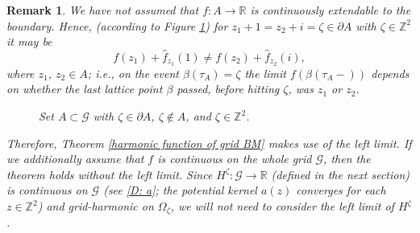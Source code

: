 \documentclass[11pt]{article}
\numberwithin{equation}{section}
\def\OZ{\Omega_{\zeta}}
\newtheorem*{remark}{Remark}
\begin{document}
\begin{remark}
  We have not assumed that $f: A \rightarrow \mathbb{R}$ is 
  continuously extendable to the boundary. 
  Hence, (according to Figure \ref{fig: set A}) for 
  $z_1 +1 = z_2 + i = \zeta \in \partial A$ 
  with $\zeta \in \mathbb{Z}^2$ it may be
  \begin{equation}\nonumber
    f(z_1) + \hat{f}_{z_1}(1) 
    \neq f(z_2) + \hat{f}_{z_2}(i),
  \end{equation}
  where $z_1$, $z_2 \in A$; i.e., 
  on the event $\beta(\tau_A)= \zeta$ the limit $f(\beta(\tau_A-))$ 
  depends on whether the last lattice 
  point $\beta$ passed, before hitting $\zeta$, was $z_1$ or $z_2$.
  \begin{figure}[H]
    \captionsetup{width=.9\linewidth}
    \hspace*{2cm}
    \caption{Set $A \subset \mathcal{G}$ with 
      $\zeta \in \partial A$, $\zeta \notin A$, and 
      $\zeta \in \mathbb{Z}^2$.}
      \label{fig: set A}
  \end{figure}
  Therefore, Theorem \ref{harmonic function of grid BM}
  makes use of the left limit. 
  If we additionally assume that 
  $f$ is continuous on the whole grid $\mathcal{G}$, 
  then the theorem holds without the left limit.
  Since $H^{\zeta}: \mathcal{G} \rightarrow \mathbb{R}$ (defined in the next section) 
  is continuous on $\mathcal{G}$ (see \eqref{D: a}; the potential kernel $a(z)$ 
  converges for each $z \in \mathbb{Z}^2$) and grid-harmonic on $\OZ$, 
  we will not need to consider the left limit of $H^{\zeta}$.    
\end{remark}
\end{document}
